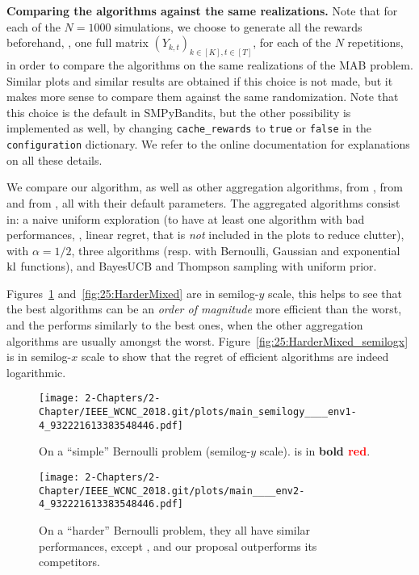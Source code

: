 \textbf{Comparing the algorithms against the same realizations.}
%
Note that for each of the $N=1000$ simulations, we choose to generate all the rewards beforehand, \ie, one full matrix $(Y_{k,t})_{k\in[K], t\in[T]}$, for each of the $N$ repetitions, in order to compare the algorithms on the same realizations of the MAB problem.
%
Similar plots and similar results are obtained if this choice is not made, but it makes more sense to compare them against the same randomization. Note that this choice is the default in SMPyBandits, but the other possibility is implemented as well, by changing \texttt{cache\_rewards} to \texttt{true} or \texttt{false} in the \texttt{configuration} dictionary.
We refer to the online documentation for explanations on all these details.

We compare our \Aggr{} algorithm,
as well as other aggregation algorithms, \ExpQ{} from \cite{Bubeck12},
\CORRAL{} from \cite{Agarwal16} and \LearnExp{} from \cite{Singla17}, all with their default parameters.
%
The aggregated algorithms consist in:
a naive uniform exploration (to have at least one algorithm with bad performances, \ie, linear regret, that is \emph{not} included in the plots to reduce clutter),
\UCB{} with $\alpha=1/2$, three \klUCB{} algorithms (resp. with Bernoulli, Gaussian and exponential $\mathrm{kl}$ functions), and BayesUCB and Thompson sampling with uniform prior.

Figures~\ref{fig:25:EasyBernoulli} and~\ref{fig:25:HarderMixed} are in semilog-$y$ scale, this helps to see that the best algorithms can be an \emph{order of magnitude} more efficient than the worst, and the \Aggr{} performs similarly to the best ones, when the other aggregation algorithms are usually amongst the worst.
Figure~\ref{fig:25:HarderMixed_semilogx} is in semilog-$x$ scale to show that the regret of efficient algorithms are indeed logarithmic.


\begin{figure}[h!]  %
	\centering
	\texttt{[image: 2-Chapters/2-Chapter/IEEE\_WCNC\_2018.git/plots/main\_semilogy\_\_\_\_env1-4\_932221613383548446.pdf]}
	\caption{On a ``simple'' Bernoulli problem (semilog-$y$ scale). \Aggr{} is in \textbf{bold \textcolor{red}{red}}.}
	\label{fig:25:EasyBernoulli}
\end{figure}

\begin{figure}[h!]  %
	\centering
	\texttt{[image: 2-Chapters/2-Chapter/IEEE\_WCNC\_2018.git/plots/main\_\_\_\_env2-4\_932221613383548446.pdf]}
	\caption{On a ``harder'' Bernoulli problem, they all have similar performances, except \LearnExp, and our proposal \Aggr{} outperforms its competitors.}
	\label{fig:25:HardBernoulli}
\end{figure}

